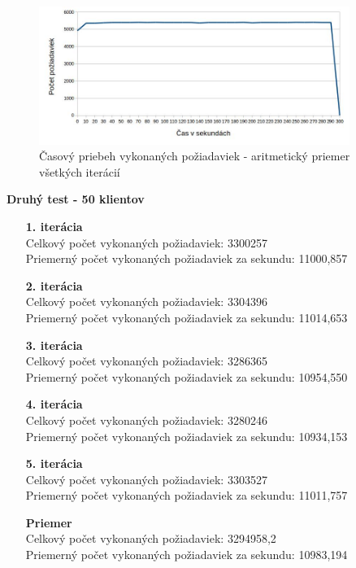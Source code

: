 \documentclass[12pt,oneside,final]{fithesis-utf8}
\begin{document}
\begin{itemize}
\begin{figure}[H]
  \centering
      \includegraphics[width=0.9\textwidth]{faban2_1_distr.jpg}
  \caption{Časový priebeh vykonaných požiadaviek - aritmetický priemer všetkých iterácií}
\end{figure}

\textbf{Druhý test - 50 klientov}
\begin{itemize}

\item[\textbf{1. iterácia}]\ \\
Celkový počet vykonaných požiadaviek: 3300257\\
Priemerný počet vykonaných požiadaviek za sekundu: 11000,857

\item[\textbf{2. iterácia}]\ \\
Celkový počet vykonaných požiadaviek: 3304396\\
Priemerný počet vykonaných požiadaviek za sekundu: 11014,653

\item[\textbf{3. iterácia}]\ \\
Celkový počet vykonaných požiadaviek: 3286365\\
Priemerný počet vykonaných požiadaviek za sekundu: 10954,550

\item[\textbf{4. iterácia}]\ \\
Celkový počet vykonaných požiadaviek: 3280246\\
Priemerný počet vykonaných požiadaviek za sekundu: 10934,153

\item[\textbf{5. iterácia}]\ \\
Celkový počet vykonaných požiadaviek: 3303527\\
Priemerný počet vykonaných požiadaviek za sekundu: 11011,757

\item[\textbf{Priemer}]\ \\
Celkový počet vykonaných požiadaviek: 3294958,2\\
Priemerný počet vykonaných požiadaviek za sekundu: 10983,194


\end{itemize}
\end{itemize}
\end{document}

